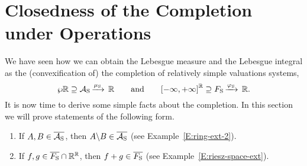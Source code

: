 \documentclass[main.tex]{subfiles}
\begin{document}
\section{Closedness of the Completion under Operations}
\label{S:closedness}
\noindent
We have seen how we can
obtain the Lebesgue measure and the Lebesgue integral
as the (convexification of) the completion
of relatively simple valuations systems,
\begin{equation*}
\wp{\mathbb{R}} \supseteq \mathcal{A}_{\mathrm{S}}\,\smash{\xrightarrow{\mu_{\mathrm{S}}}\,\mathbb{R}}\qquad\text{and}\qquad{[-\infty,+\infty]}^{\mathbb{R}} \supseteq F_{\mathrm{S}}\,\smash{\xrightarrow{\varphi_{\mathrm{S}}}\,\mathbb{R}}.
\end{equation*}
It is now time to derive some simple facts
about the completion.
In this section we will prove
statements of the following form.
\begin{enumerate}
\item
If $A,B\in\overline{\mathcal{A}_{\mathrm{S}}}$,
then $A\backslash B \in\overline{\mathcal{A}_{\mathrm{S}}}$
(see Example~\ref{E:ring-ext-2}).

\item 
If $f,g\in \overline{F_{\mathrm{S}}} \cap \mathbb{R}^{\mathbb{R}}$,
then $f+g \in \overline{F_{\mathrm{S}}}$
(see Example~\ref{E:riesz-space-ext}).
\end{enumerate}
\end{document}
